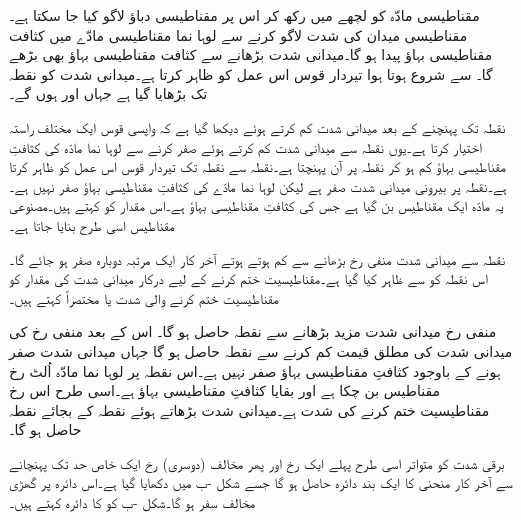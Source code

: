 مقناطیسی مادّہ کو لچھے میں رکھ کر اس پر مقناطیسی دباؤ لاگو کیا جا سکتا ہے۔ مقناطیسی میدان کی شدت   لاگو کرنے سے لوہا نما مقناطیسی مادّے میں کثافت مقناطیسی بہاؤ   پیدا ہو گا۔میدانی شدت بڑھانے سے کثافت مقناطیسی بہاؤ بھی بڑھے گا۔  سے شروع ہوتا ہوا   تیردار قوس اس عمل کو ظاہر کرتا ہے۔میدانی شدت کو نقطہ   تک بڑھایا گیا ہے جہاں   اور  ہوں گے۔


نقطہ  تک پہنچنے کے بعد میدانی شدت کم کرتے ہوئے دیکھا گیا ہے کہ واپسی  قوس ایک مختلف راستہ اختیار کرتا ہے۔یوں نقطہ   سے میدانی شدت کم کرتے ہوئے صفر کرنے سے  لوہا نما مادّہ کی کثافتِ مقناطیسی بہاؤ کم ہو کر نقطہ  پر آن پہنچتا ہے۔نقطہ  سے نقطہ  تک تیردار قوس اس عمل کو ظاہر کرتا ہے۔نقطہ  پر بیرونی میدانی شدت صفر ہے لیکن لوہا نما مادّے کی کثافتِ مقناطیسی بہاؤ صفر نہیں ہے۔یہ مادّہ ایک مقناطیس بن گیا ہے جس کی کثافتِ مقناطیسی بہاؤ   ہے۔اس مقدار کو   کہتے ہیں۔مصنوعی مقناطیس اسی طرح بنایا جاتا ہے۔

نقطہ  سے میدانی شدت منفی رخ  بڑھانے سے   کم ہوتے ہوتے آخر کار ایک مرتبہ دوبارہ صفر ہو جائے گا۔اس نقطہ کو  سے ظاہر کیا گیا ہے۔مقناطیسیت ختم کرنے کے لیے درکار میدانی شدت کی مقدار   کو مقناطیسیت ختم کرنے والی شدت یا مختصراً  کہتے ہیں۔

منفی رخ  میدانی شدت مزید بڑھانے سے  نقطہ  حاصل ہو گا۔ اس کے بعد منفی رخ  کی میدانی شدت کی مطلق قیمت کم کرنے سے  نقطہ  حاصل ہو گا جہاں میدانی شدت صفر ہونے کے باوجود کثافتِ مقناطیسی بہاؤ صفر نہیں ہے۔اس نقطہ پر لوہا نما مادّہ اُلٹ رخ مقناطیس بن چکا ہے اور  بقایا کثافتِ مقناطیسی بہاؤ ہے۔اسی طرح اس رخ مقناطیسیت ختم کرنے کی شدت  ہے۔میدانی شدت بڑھاتے ہوئے نقطہ  کے بجائے   نقطہ  حاصل ہو گا۔

برقی شدت کو متواتر اسی طرح پہلے ایک رخ اور پھر مخالف (دوسری) رخ  ایک خاص حد تک پہنچانے سے  آخر کار   منحنی کا ایک بند دائرہ حاصل ہو گا جسے شکل -ب میں دکھایا گیا ہے۔اس دائرہ پر گھڑی مخالف سفر ہو گا۔شکل -ب کو   کا دائرہ  کہتے ہیں۔

